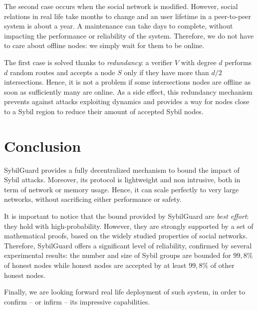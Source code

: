 \documentclass[a4paper,11pt]{article}
\begin{document}
The second case occurs when the social network is modified. However,
social relations in real life take months to change and an user
lifetime in a peer-to-peer system is about a year. A maintenance can
take days to complete, without impacting the performance or
reliability of the system. Therefore, we do not have to care about
offline nodes: we simply wait for them to be online.

The first case is solved thanks to \emph{redundancy}: a verifier $V$
with degree $d$ performs $d$ random routes and accepts a node $S$ only
if they have more than $d/2$ intersections.  Hence, it is not a
problem if some intersections nodes are offline as soon as
sufficiently many are online. As a side effect, this redundancy
mechanism prevents against attacks exploiting dynamics and provides a
way for nodes close to a Sybil region to reduce their amount of
accepted Sybil nodes.

\section*{Conclusion}


SybilGuard provides a fully decentralized mechanism to bound the
impact of Sybil attacks. Moreover, its protocol is lightweight and non
intrusive, both in term of network or memory usage. Hence, it can
scale perfectly to very large networks, without sacrificing either
performance or safety.


It is important to notice that the bound provided by SybilGuard are
\emph{best effort}: they hold with high-probability. However, they are
strongly supported by a set of mathematical proofs, based on the
widely studied properties of social networks. Therefore, SybilGuard
offers a significant level of reliability, confirmed by several
experimental results: the number and size of Sybil groups are bounded
for $99,8\%$ of honest nodes while honest nodes are accepted by at
least $99,8\%$ of other honest nodes.


Finally, we are looking forward real life deployment of such system,
in order to confirm -- or infirm -- its impressive capabilities.



{}

\end{document}
